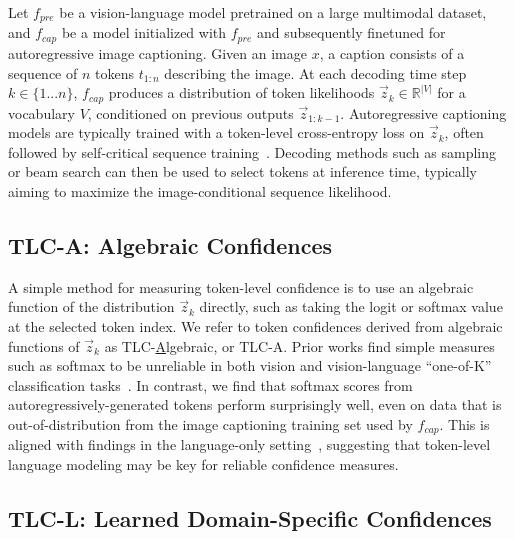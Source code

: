 \documentclass[10pt,twocolumn,letterpaper]{article}
\newcommand{\minisection}[1]{\noindent{\textbf{#1.}}}
\newcommand{\ApproachName}{TLC\xspace}
\begin{document}
\minisection{Preliminaries} Let $f_{\mathit{pre}}$ be a vision-language model pretrained on a large multimodal dataset, and $f_{\mathit{cap}}$ be a model initialized with $f_{\mathit{pre}}$ and subsequently finetuned for autoregressive image captioning.
Given an image $x$, a caption consists of a sequence of $n$ tokens $t_{1:n}$ describing the image. At each decoding time step $k \in \{1...n\}$, $f_{\mathit{cap}}$ produces a distribution of token likelihoods $\vec{z}_k \in \mathbb{R}^{|V|}$ for a vocabulary $V$, conditioned on previous outputs $\vec{z}_{1:k-1}$. Autoregressive captioning models are typically trained with a token-level cross-entropy loss on $\vec{z}_k$, often followed by self-critical sequence training~\cite{rennie2017self}. Decoding methods such as sampling or beam search can then be used to select tokens at inference time, typically aiming to maximize the image-conditional sequence likelihood.

\subsection{\ApproachName-A: Algebraic Confidences}
\label{sec:method-algebraic}

A simple method for measuring token-level confidence is to use an algebraic function of the distribution $\vec{z}_k$ directly, such as taking the logit or softmax value at the selected token index. We refer to token confidences derived from algebraic functions of $\vec{z}_k$ as \ApproachName-\underline{A}lgebraic, or \ApproachName-A. Prior works find simple measures such as softmax to be unreliable in both vision and vision-language ``one-of-K'' classification tasks~\cite{guo2017calibration,whitehead2022reliable}. In contrast, we find that softmax scores from autoregressively-generated tokens perform surprisingly well, even on data that is out-of-distribution from the image captioning training set used by $f_{\mathit{cap}}$. This is aligned with findings in the language-only setting~\cite{desai2020calibration,stengel2022calibrated,varshney2022investigating}, suggesting that token-level language modeling may be key for reliable confidence measures.


\subsection{\ApproachName-L: Learned Domain-Specific Confidences}
\label{sec:method-learning}
\end{document}
